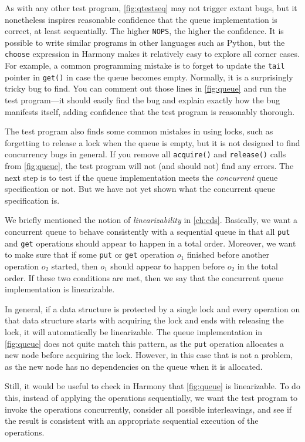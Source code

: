 \documentclass{report}
\begin{document}
As with any other test program,
\autoref{fig:qtestseq} may not trigger extant bugs, but
it nonetheless inspires reasonable confidence that the
queue implementation is correct, at least sequentially.
The higher \texttt{NOPS}, the higher the confidence.
It is possible to write similar programs in other languages
such as Python, but the \texttt{choose} expression in Harmony
makes it relatively easy to explore all corner cases.
%
For example, a common programming mistake is to forget to
update the \texttt{tail} pointer in \texttt{get()} in case
the queue becomes empty.  Normally, it is a surprisingly
tricky bug to find.  You can comment out those lines
in \autoref{fig:queue} and run the test program---it should
easily find the bug and explain exactly how
the bug manifests itself, adding confidence that the test program
is reasonably thorough.

The test program also finds some common mistakes in using
locks, such as forgetting to release a lock when the queue
is empty, but it is not designed to find concurrency bugs
in general.  If you remove all \texttt{acquire()} and
\texttt{release()} calls from \autoref{fig:queue},
the test program will not (and should not)
find any errors.
The next step is to test if the queue implementation
meets the \emph{concurrent} queue specification or not.
But we have not yet shown what the
concurrent queue specification is.

We briefly mentioned the notion of \emph{linearizability}
in \autoref{ch:cds}.
Basically, we want a concurrent queue to behave
consistently with a sequential queue in that all
\texttt{put}
and \texttt{get} operations should appear to happen
in a total order.
Moreover, we want to make sure that if some
\texttt{put} or \texttt{get} operation $o_1$ finished
before another operation $o_2$ started, then $o_1$
should appear to happen before $o_2$ in the total order.
If these two conditions are met, then we say that
the concurrent queue implementation is linearizable.

In general, if a data structure is protected by
a single lock and every operation on that data
structure starts with acquiring the lock and ends
with releasing the lock, it will automatically be
linearizable.
The queue implementation in \autoref{fig:queue} does
not quite match this pattern, as the \texttt{put}
operation allocates a new node before acquiring
the lock.
However, in this case that is not a problem, as
the new node has no dependencies on the queue
when it is allocated.

Still, it would be useful to check in Harmony that
\autoref{fig:queue} is linearizable.
To do this, instead of applying the operations sequentially,
we want the test program to invoke the operations concurrently,
consider all possible interleavings, and see if the result
is consistent with an appropriate sequential execution of the
operations.
\end{document}
